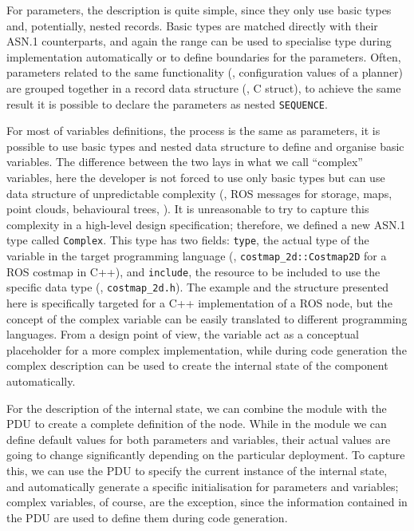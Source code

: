 For parameters, the description is quite simple, since they only use basic types and, potentially, nested records. Basic types are matched directly with their ASN.1 counterparts, and again the range can be used to specialise type during implementation automatically or to define boundaries for the parameters. Often, parameters related to the same functionality (\eg, configuration values of a planner) are grouped together in a record data structure (\eg, C struct), to achieve the same result it is possible to declare the parameters as nested \texttt{SEQUENCE}. 

For most of variables definitions, the process is the same as parameters, it is possible to use basic types and nested data structure to define and organise basic variables. The difference between the two lays in what we call ``complex'' variables, here the developer is not forced to use only basic types but can use data structure of unpredictable complexity (\eg, ROS messages for storage, maps, point clouds, behavioural trees, \etc). It is unreasonable to try to capture this complexity in a high-level design specification; therefore, we defined a new ASN.1 type called \texttt{Complex}. This type has two fields: \texttt{type}, the actual type of the variable in the target programming language (\eg, \texttt{costmap\_2d::Costmap2D} for a ROS costmap in C++), and \texttt{include}, the resource to be included to use the specific data type (\eg, \texttt{costmap\_2d.h}). The example and the structure presented here is specifically targeted for a C++ implementation of a ROS node, but the concept of the complex variable can be easily translated to different programming languages. From a design point of view, the variable act as a conceptual placeholder for a more complex implementation, while during code generation the complex description can be used to create the internal state of the component automatically. 

For the description of the internal state, we can combine the module with the PDU to create a complete definition of the node. While in the module we can define default values for both parameters and variables, their actual values are going to change significantly depending on the particular deployment. To capture this, we can use the PDU to specify the current instance of the internal state, and automatically generate a specific initialisation for parameters and variables; complex variables, of course, are the exception, since the information contained in the PDU are used to define them during code generation.

